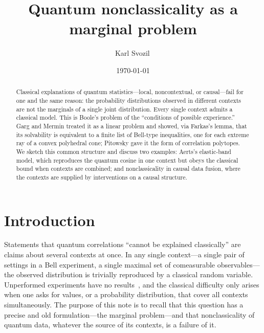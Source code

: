 \documentclass[aps,pra,reprint,superscriptaddress,longbibliography,nofootinbib]{revtex4-2}
\begin{document}
\title{Quantum nonclassicality as a marginal problem}

\author{Karl Svozil\,}

\date{\today}

\begin{abstract}
Classical explanations of quantum statistics---local, noncontextual, or causal---fail for one and the same reason: the probability distributions observed in different contexts are not the marginals of a single joint distribution.
Every single context admits a classical model.
This is Boole's problem of the ``conditions of possible experience.''
Garg and Mermin treated it as a linear problem and showed, via Farkas's lemma, that its solvability is equivalent to a finite list of Bell-type inequalities, one for each extreme ray of a convex polyhedral cone; Pitowsky gave it the form of correlation polytopes.
We sketch this common structure and discuss two examples:
Aerts's elastic-band model, which reproduces the quantum cosine in one context but obeys the classical bound when contexts are combined;
and nonclassicality in causal data fusion, where the contexts are supplied by interventions on a causal structure.
\end{abstract}

\maketitle

\section{Introduction}

Statements that quantum correlations ``cannot be explained classically'' are claims about several contexts at once.
In any single context---a single pair of settings in a Bell experiment, a single maximal set of comeasurable observables---the observed distribution is trivially reproduced by a classical random variable.
Unperformed experiments have no results~\cite{peres222}, and the classical difficulty only arises when one asks for values, or a probability distribution, that cover all contexts simultaneously.
The purpose of this note is to recall that this question has a precise and old formulation---the marginal problem---and that nonclassicality of quantum data, whatever the source of its contexts, is a failure of it.
\end{document}

